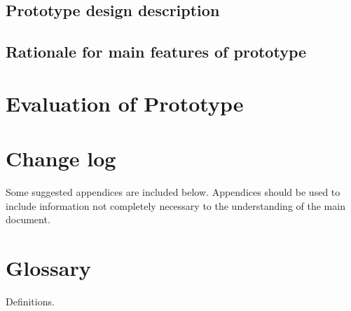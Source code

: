 \documentclass{l3deliverable}
\begin{document}
\subsection{Prototype design description}

\subsection{Rationale for main features of prototype}

\section{Evaluation of Prototype}

\section{Change log}

\appendix

Some suggested appendices are included below. Appendices should be
used to include information not completely necessary to the
understanding of the main document.

\section{Glossary}

Definitions.
\end{document}
